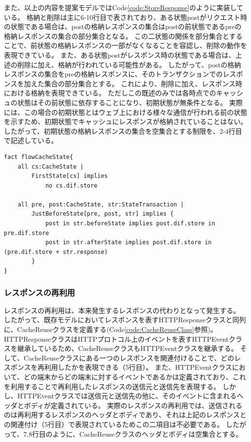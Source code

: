 \documentclass[12pt,a4paper]{jbook}
\begin{document}
また、以上の内容を提案モデルではCode\ref{code:StoreResponse}のように実装している。
格納と削除は主に6-10行目で表されており、ある状態postがリクエスト時の状態である場合は、postの格納レスポンスの集合はpostの前状態であるpreの格納レスポンスの集合の部分集合となる。
この二状態の関係を部分集合とすることで、前状態の格納レスポンスの一部がなくなることを容認し、削除の動作を表現できている。
また、ある状態postがレスポンス時の状態である場合は、上述の削除に加え、格納が行われている可能性がある。
したがって、postの格納レスポンスの集合をpreの格納レスポンスに、そのトランザクションでのレスポンスを加えた集合の部分集合とする。
これにより、削除に加え、レスポンス時における格納を表現できている。
ただしこの既述のみでは各時点でのキャッシュの状態はその前状態に依存することになり、初期状態が無条件となる。
実際には、この場合の初期状態とはウェブ上における様々な通信が行われる前の状態を示すため、初期状態でキャッシュにレスポンスが格納されていることはない。
したがって、初期状態の格納レスポンスの集合を空集合とする制限を、2-4行目で記述している。

\begin{lstlisting}[caption=レスポンスの格納と削除の表現, label=code:StoreResponse]
fact flowCacheState{
	all cs:CacheState |
		FirstState[cs] implies
			no cs.dif.store

	all pre, post:CacheState, str:StateTransaction |
		JustBeforeState[pre, post, str] implies {
			post in str.beforeState implies post.dif.store in pre.dif.store
			post in str.afterState implies post.dif.store in (pre.dif.store + str.response)
		}
}
\end{lstlisting}

\subsubsection{レスポンスの再利用}
レスポンスの再利用は、本来発生するレスポンスの代わりとなって発生する。
したがって、既存モデルにおいてレスポンスを表すHTTPResponseクラスと同列に、CacheReuseクラスを定義する(Code\ref{code:CacheReuseClass}参照)。
HTTPResponseクラスはHTTPプロトコル上のイベントを表すHTTPEventクラスを継承しているため、CacheReuseクラスもHTTPEventクラスを継承する。
そして、CacheReuseクラスにある一つのレスポンスを関連付けることで、どのレスポンスを再利用したかを表現できる（5行目）。
また、HTTPEventクラスにおいて、どの端末からどの端末に対するイベントであるかは定義されており、これを利用することで再利用したレスポンスの送信元と送信先を表現する。
しかし、HTTPEventクラスでは送信元と送信先の他に、そのイベントに含まれるヘッダとボディが定義されている。
実際のレスポンスの再利用では、送信されるのは再利用するレスポンスのヘッダとボディであり、それは上記のレスポンスとの関連付け（5行目）で表現されているためこの二項目は不必要である。
したがって、7,8行目のように、CacheReuseクラスのヘッダとボディは空集合とする。
\end{document}
